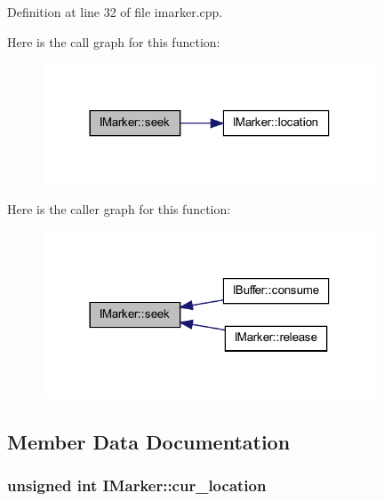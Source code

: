 Definition at line 32 of file imarker.cpp.



Here is the call graph for this function:\nopagebreak
\begin{figure}[H]
\begin{center}
\leavevmode
\includegraphics[width=282pt]{class_i_marker_a58086bbf091c5b49c15464a070fec171_cgraph}
\end{center}
\end{figure}




Here is the caller graph for this function:\nopagebreak
\begin{figure}[H]
\begin{center}
\leavevmode
\includegraphics[width=282pt]{class_i_marker_a58086bbf091c5b49c15464a070fec171_icgraph}
\end{center}
\end{figure}




\subsection{Member Data Documentation}
\hypertarget{class_i_marker_adedaefcf6a1b1eac3d728a9d318dc618}{
\subsubsection[{cur\_\-location}]{\setlength{\rightskip}{0pt plus 5cm}unsigned int {\bf IMarker::cur\_\-location}}}
\label{class_i_marker_adedaefcf6a1b1eac3d728a9d318dc618}


